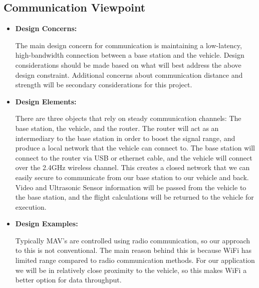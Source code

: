 \documentclass[onecolumn, draftclsnofoot,10pt, compsoc]{IEEEtran}
\begin{document}
\subsection{Communication Viewpoint} 
\begin{itemize}
 \item{ \textbf{Design Concerns:}}

The main design concern for communication is maintaining a low-latency, high-bandwidth connection between a base station and the vehicle. Design considerations should be made based on what will best address the above design constraint. Additional concerns about communication distance and strength will be secondary considerations for this project. \\ 

\item{ \textbf{Design Elements:}}

There are three objects that rely on steady communication channels: The base station, the vehicle, and the router. The router will act as an intermediary to the base station in order to boost the signal range, and produce a local network that the vehicle can connect to. The base station will connect to the router via USB or ethernet cable, and the vehicle will connect over the 2.4GHz wireless channel. This creates a closed network that we can easily secure to communicate from our base station to our vehicle and back. Video and Ultrasonic Sensor information will be passed from the vehicle to the base station, and the flight calculations will be returned to the vehicle for execution. \\

\item{ \textbf{Design Examples:}}

Typically MAV's are controlled using radio communication, so our approach to this is not conventional. The main reason behind this is because WiFi has limited range compared to radio communication methods. For our application we will be in relatively close proximity to the vehicle, so this makes WiFi a better option for data throughput. \\


\end{itemize}
\end{document}
